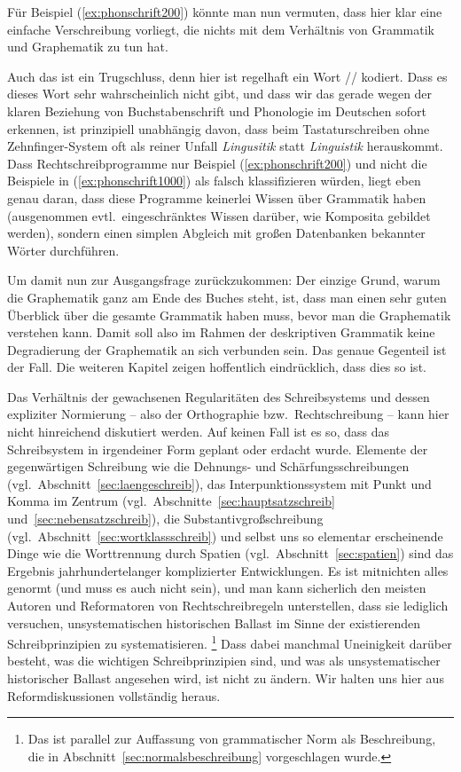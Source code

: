 Für Beispiel (\ref{ex:phonschrift200}) könnte man nun vermuten, dass hier klar eine einfache Verschreibung vorliegt, die nichts mit dem Verhältnis von Grammatik und Graphematik zu tun hat.

\begin{exe}
\end{exe}

Auch das ist ein Trugschluss, denn hier ist regelhaft ein Wort // kodiert.
Dass es dieses Wort sehr wahrscheinlich nicht gibt, und dass wir das gerade wegen der klaren Beziehung von Buchstabenschrift und Phonologie im Deutschen sofort erkennen, ist prinzipiell unabhängig davon, dass beim Tastaturschreiben ohne Zehnfinger-System oft als reiner Unfall \textit{Lingusitik} statt \textit{Linguistik} herauskommt.
Dass Rechtschreibprogramme nur Beispiel (\ref{ex:phonschrift200}) und nicht die Beispiele in (\ref{ex:phonschrift1000}) als falsch klassifizieren würden, liegt eben genau daran, dass diese Programme keinerlei Wissen über Grammatik haben (ausgenommen evtl.\ eingeschränktes Wissen darüber, wie Komposita gebildet werden), sondern einen simplen Abgleich mit großen Datenbanken bekannter Wörter durchführen.

Um damit nun zur Ausgangsfrage zurückzukommen:
Der einzige Grund, warum die Graphematik ganz am Ende des Buches steht, ist, dass man einen sehr guten Überblick über die gesamte Grammatik haben muss, bevor man die Graphematik verstehen kann.
Damit soll also im Rahmen der deskriptiven Grammatik keine Degradierung der Graphematik an sich verbunden sein.
Das genaue Gegenteil ist der Fall.
Die weiteren Kapitel zeigen hoffentlich eindrücklich, dass dies so ist.

Das Verhältnis der gewachsenen Regularitäten des Schreibsystems und dessen expliziter Normierung -- also der Orthographie bzw.\ Rechtschreibung -- kann hier nicht hinreichend diskutiert werden.
Auf keinen Fall ist es so, dass das Schreibsystem in irgendeiner Form geplant oder erdacht wurde.
Elemente der gegenwärtigen Schreibung wie die Dehnungs- und Schärfungsschreibungen (vgl.\ Abschnitt~\ref{sec:laengeschreib}), das Interpunktionssystem mit Punkt und Komma im Zentrum (vgl.\ Abschnitte~\ref{sec:hauptsatzschreib} und~\ref{sec:nebensatzschreib}), die Substantivgroßschreibung (vgl.\ Abschnitt~\ref{sec:wortklassschreib}) und selbst uns so elementar erscheinende Dinge wie die Worttrennung durch Spatien (vgl.\ Abschnitt~\ref{sec:spatien}) sind das Ergebnis jahrhundertelanger komplizierter Entwicklungen.
Es ist mitnichten alles genormt (und muss es auch nicht sein), und man kann sicherlich den meisten Autoren und Reformatoren von Rechtschreibregeln unterstellen, dass sie lediglich versuchen, unsystematischen historischen Ballast im Sinne der existierenden Schreibprinzipien zu systematisieren.%
\footnote{Das ist parallel zur Auffassung von grammatischer Norm als Beschreibung, die in Abschnitt~\ref{sec:normalsbeschreibung} vorgeschlagen wurde.}
Dass dabei manchmal Uneinigkeit darüber besteht, was die wichtigen Schreibprinzipien sind, und was als unsystematischer historischer Ballast angesehen wird, ist nicht zu ändern.
Wir halten uns hier aus Reformdiskussionen vollständig heraus.

